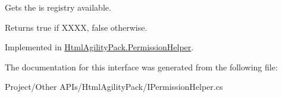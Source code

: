 Gets the is registry available. 

\begin{DoxyReturn}{Returns}
{\ttfamily true} if X\+X\+XX, {\ttfamily false} otherwise.
\end{DoxyReturn}


Implemented in \hyperlink{class_html_agility_pack_1_1_permission_helper_ab4317f2498d3a9997e6dba12abaf6842}{Html\+Agility\+Pack.\+Permission\+Helper}.



The documentation for this interface was generated from the following file\+:\begin{DoxyCompactItemize}
\item 
Project/\+Other A\+P\+Is/\+Html\+Agility\+Pack/I\+Permission\+Helper.\+cs\end{DoxyCompactItemize}
